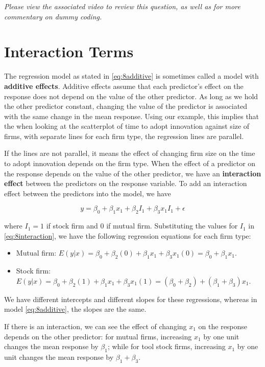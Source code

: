 \documentclass[
]{book}
\begin{document}
\emph{Please view the associated video to review this question, as well as for more commentary on dummy coding.}

\hypertarget{interaction-terms}{%
\section{Interaction Terms}\label{interaction-terms}}

The regression model as stated in \eqref{eq:8additive} is sometimes called a model with \textbf{additive effects}. Additive effects assume that each predictor's effect on the response does not depend on the value of the other predictor. As long as we hold the other predictor constant, changing the value of the predictor is associated with the same change in the mean response. Using our example, this implies that the when looking at the scatterplot of time to adopt innovation against size of firms, with separate lines for each firm type, the regression lines are parallel.

If the lines are not parallel, it means the effect of changing firm size on the time to adopt innovation depends on the firm type. When the effect of a predictor on the response depends on the value of the other predictor, we have an \textbf{interaction effect} between the predictors on the response variable. To add an interaction effect between the predictors into the model, we have

\begin{equation} 
y = \beta_0 + \beta_1x_{1} + \beta_2I_1 + \beta_3 x_1 I_1 + \epsilon
\label{eq:8interaction}
\end{equation}

where \(I_1 = 1\) if stock firm and 0 if mutual firm. Substituting the values for \(I_1\) in \eqref{eq:8interaction}, we have the following regression equations for each firm type:

\begin{itemize}
\item
  Mutual firm: \(E(y|x) = \beta_0+\beta_2(0)+\beta_1x_1+\beta_3 x_1(0)=\beta_0+\beta_1x_1.\)
\item
  Stock firm: \(E(y|x) = \beta_0+\beta_2(1)+\beta_1x_1+\beta_3 x_1(1)=(\beta_0+\beta_2)+(\beta_1+\beta_3)x_1.\)
\end{itemize}

We have different intercepts and different slopes for these regressions, whereas in model \eqref{eq:8additive}, the slopes are the same.

If there is an interaction, we can see the effect of changing \(x_1\) on the response depends on the other predictor: for mutual firms, increasing \(x_1\) by one unit changes the mean response by \(\beta_1\); while for tool stock firms, increasing \(x_1\) by one unit changes the mean response by \(\beta_1 + \beta_3\).
\end{document}
